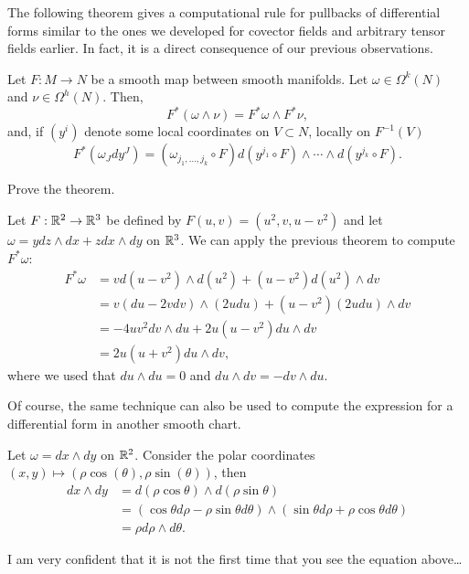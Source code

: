 The following theorem gives a computational rule for pullbacks of differential forms similar to the ones we developed for covector fields and arbitrary tensor fields earlier.
In fact, it is a direct consequence of our previous observations.

\begin{theorem}\label{thm:pullbacksdifferentialforms}
	Let $F: M\to N$ be a smooth map between smooth manifolds.
	Let $\omega\in\Omega^k(N)$ and $\nu\in\Omega^h(N)$.
	Then,
	\begin{equation}
		F^*(\omega\wedge\nu) = F^*\omega \wedge F^*\nu,
	\end{equation}
	and, if $(y^i)$ denote some local coordinates on $V\subset N$, locally on $F^{-1}(V)$
	\begin{equation}
		F^*\left(\omega_J dy^J\right) = (\omega_{j_1,\ldots, j_k}\circ F) d(y^{j_1}\circ F)\wedge\cdots\wedge d(y^{j_k}\circ F).
	\end{equation}
\end{theorem}
\begin{exercise}
	Prove the theorem.
\end{exercise}

\begin{example}
	Let $F:\mathbb{R}^2\to\mathbb{R}^3$ be defined by $F(u,v) = (u^2,v,u-v^2)$ and let $\omega = y dz\wedge dx + z dx\wedge dy$ on $\mathbb{R}^3$.
	We can apply the previous theorem to compute $F^*\omega$:
	\begin{align}
		F^*\omega & = v d(u-v^2)\wedge d(u^2) + (u-v^2) d(u^2)\wedge dv     \\
		          & = v (du-2vdv)\wedge (2 u du) + (u-v^2) (2u du)\wedge dv \\
		          & = -4uv^2 dv\wedge du + 2u(u-v^2) du\wedge dv            \\
		          & = 2u (u + v^2) du \wedge dv,
	\end{align}
	where we used that $du\wedge du =0$ and $du\wedge dv = -dv\wedge du$.
\end{example}

Of course, the same technique can also be used to compute the expression for a differential form in another smooth chart.

\begin{example}
	Let $\omega = dx\wedge dy$ on $\mathbb{R}^2$.
	Consider the polar coordinates $(x,y)\mapsto (\rho\cos(\theta),\rho\sin(\theta))$, then
	\begin{align}
		dx\wedge dy & = d(\rho\cos\theta)\wedge d(\rho\sin\theta)                                                    \\
		            & = (\cos\theta d\rho -\rho\sin\theta d\theta)\wedge (\sin\theta d\rho + \rho\cos\theta d\theta) \\
		            & = \rho d\rho\wedge d\theta.
	\end{align}

	I am very confident that it is not the first time that you see the equation above\ldots
\end{example}

